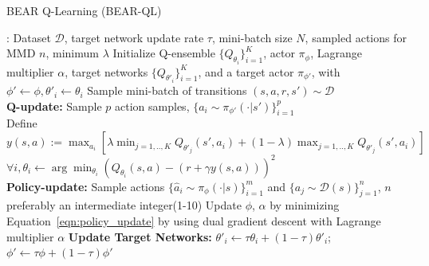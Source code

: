\vspace{-5pt}
\begin{algorithm}[H]
\small
\caption{BEAR Q-Learning (BEAR-QL)}
\label{alg:q_learning}
\begin{algorithmic}[1]
    \INPUT: Dataset $\mathcal{D}$, target network update rate $\tau$, mini-batch size $N$, sampled actions for MMD $n$, minimum $\lambda$
    \STATE Initialize Q-ensemble $\{Q_{\theta_i} \}_{i=1}^{K}$, actor $\pi_{\phi}$, Lagrange multiplier $\alpha$, target networks $\{ Q_{\theta'_i} \}_{i=1}^K$, and a target actor $\pi_{\phi'}$, with $\phi' \leftarrow \phi, \theta'_i \leftarrow \theta_i$
        \STATE Sample mini-batch of transitions $(s, a, r, s') \sim \mathcal{D}$\\
        \textbf{Q-update:}
            \STATE Sample $p$ action samples, $\{a_i \sim \pi_{\phi'}(\cdot|s')\}_{i=1}^p$\\
            \STATE Define $y(s, a) := \max_{a_i} [ \lambda \min_{j=1,..,K} Q_{\theta'_j}(s', a_i) + (1 - \lambda) \max_{j=1,..,K} Q_{\theta'_j}(s', a_i)]$\\
            \STATE $\forall i, \theta_i \leftarrow \arg \min_{\theta_i} (Q_{\theta_i}(s, a) - (r + \gamma y(s, a)))^2$\\
        \textbf{Policy-update:}
        \STATE Sample actions $\{ \hat{a}_i \sim \pi_{\phi}(\cdot | s) \}_{i=1}^{m}$ and $\{ a_j \sim \mathcal{D}(s)\}_{j=1}^{n}$, $n$ preferably an intermediate integer(1-10)
        \STATE Update $\phi$, $\alpha$ by minimizing Equation~\ref{eqn:policy_update} by using dual gradient descent with Lagrange multiplier $\alpha$
        \STATE \textbf{Update Target Networks: } $\theta'_i \leftarrow \tau \theta_i + (1 - \tau)\theta'_i$; $\phi' \leftarrow \tau \phi + (1 -\tau) \phi'$ 
    \ENDFOR
\end{algorithmic}
\label{algo:bear_ql}
\end{algorithm}
